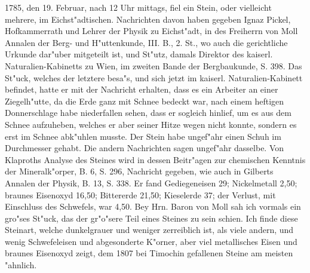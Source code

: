 \documentclass[a4paper, 11pt, oneside, polutonikogreek, german]{article}
\begin{document}
1785, den 19. Februar, nach 12 Uhr mittags, fiel ein Stein, oder vielleicht mehrere, im Eichst"adtischen. Nachrichten davon haben gegeben Ignaz Pickel, Hofkammerrath und Lehrer der Physik zu Eichst"adt, in des Freiherrn von Moll Annalen der Berg- und H"uttenkunde, III. B., 2. St., wo auch die gerichtliche Urkunde dar"uber mitgeteilt ist, und St"utz, damals Direktor des kaiserl. Naturalien-Kabinetts zu Wien, im zweiten Bande der Bergbaukunde, S. 398. Das St"uck, welches der letztere besa"s, und sich jetzt im kaiserl. Naturalien-Kabinett befindet, hatte er mit der Nachricht erhalten, dass es ein Arbeiter an einer Ziegelh"utte, da die Erde ganz mit Schnee bedeckt war, nach einem heftigen Donnerschlage habe niederfallen sehen, dass er sogleich hinlief, um es aus dem Schnee aufzuheben, welches er aber seiner Hitze wegen nicht konnte, sondern es erst im Schnee abk"uhlen musste. Der Stein habe ungef"ahr einen Schuh im Durchmesser gehabt. Die andern Nachrichten sagen ungef"ahr dasselbe. Von Klaproths Analyse des Steines wird in dessen Beitr"agen zur chemischen Kenntnis der Mineralk"orper, B. 6, S. 296, Nachricht gegeben, wie auch in Gilberts Annalen der Physik, B. 13, S. 338. Er fand Gediegeneisen 29; Nickelmetall 2,50; braunes Eisenoxyd 16,50; Bittererde 21,50; Kieselerde 37; der Verlust, mit Einschluss des Schwefels, war 4,50. Bey Hrn. Baron von Moll sah ich vormals ein gro"ses St"uck, das der gr"o"sere Teil eines Steines zu sein schien. Ich finde diese Steinart, welche dunkelgrauer und weniger zerreiblich ist, als viele andern, und wenig Schwefeleisen und abgesonderte K"orner, aber viel metallisches Eisen und braunes Eisenoxyd zeigt, dem 1807 bei Timochin gefallenen Steine am meisten "ahnlich.
\end{document}
